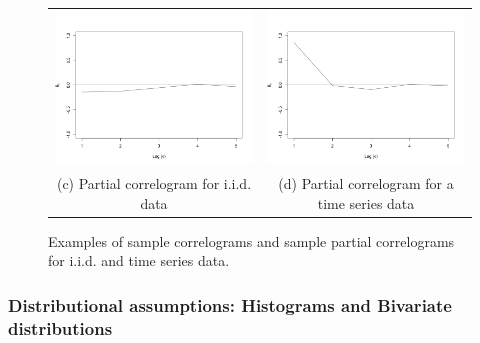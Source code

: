 \begin{figure}
\begin{center}
\begin{tabular}{cc}
\includegraphics[scale=0.25]{./figures/PartialCorrelogramGaussian} &
\includegraphics[scale=0.25]{./figures/PartialCorrelogramTimeSerie} \\
(c) Partial correlogram for i.i.d. data & (d) Partial correlogram for a time series data \\
\end{tabular}
\caption{\label{Figure:PreliminariesCorrelograms} Examples of sample correlograms and sample partial correlograms for i.i.d. and time series data. 
}
\end{center}
\end{figure}

\subsubsection{Distributional assumptions: Histograms and Bivariate distributions}

